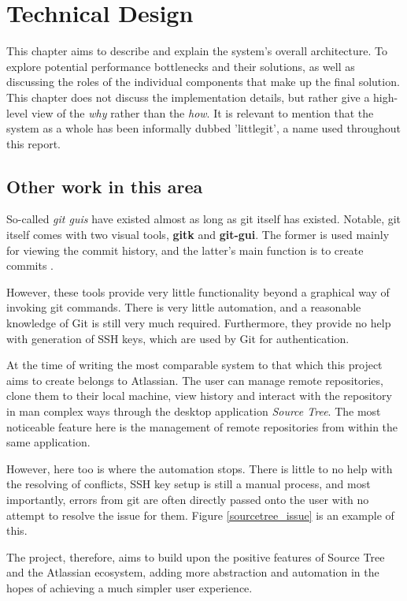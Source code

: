 \chapter{Technical Design}

This chapter aims to describe and explain the system's overall architecture. To explore potential performance bottlenecks and their solutions, as well as discussing the roles of the individual components that make up the final solution. This chapter does not discuss the implementation details, but rather give a high-level view of the \emph{why} rather than the \emph{how}. It is relevant to mention that the system as a whole has been informally dubbed 'littlegit', a name used throughout this report.

\section{Other work in this area}

So-called \emph{git guis} have existed almost as long as git itself has existed. Notable, git itself comes with two visual tools, \textbf{gitk} and \textbf{git-gui}. The former is used mainly for viewing the commit history, and the latter's main function is to create commits \cite{gitguis}.

However, these tools provide very little functionality beyond a graphical way of invoking git commands. There is very little automation, and a reasonable knowledge of Git is still very much required. Furthermore, they provide no help with generation of SSH keys, which are used by Git for authentication.

At the time of writing the most comparable system to that which this project aims to create belongs to Atlassian. The user can manage remote repositories, clone them to their local machine, view history and interact with the repository in man complex ways through the desktop application \emph{Source Tree}. The most noticeable feature here is the management of remote repositories from within the same application. 

However, here too is where the automation stops. There is little to no help with the resolving of conflicts, SSH key setup is still a manual process, and most importantly, errors from git are often directly passed onto the user with no attempt to resolve the issue for them. Figure \ref{sourcetree_issue} is an example of this.

The project, therefore, aims to build upon the positive features of Source Tree and the Atlassian ecosystem, adding more abstraction and automation in the hopes of achieving a much simpler user experience.

